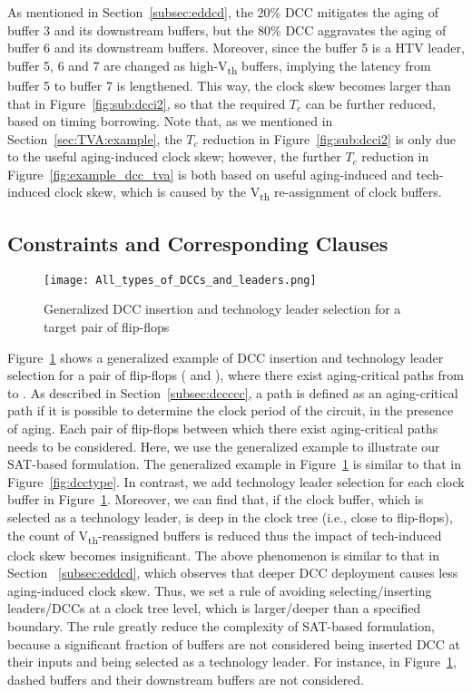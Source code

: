As mentioned in Section~\ref{subsec:eddcd}, the 20\% DCC mitigates the aging of buffer 3 and its downstream buffers, but the 80\% DCC aggravates the aging of buffer 6 and its downstream buffers. Moreover, since the buffer 5 is a HTV leader, buffer 5, 6 and 7 are changed as high-V\textsubscript{th} buffers, implying the latency from buffer 5 to buffer 7 is lengthened. This way, the clock skew becomes larger than that in Figure~\ref{fig:sub:dcci2}, so that the required $T_c$ can be further reduced, based on timing borrowing. Note that, as we mentioned in Section~\ref{sec:TVA:example}, the $T_c$ reduction in Figure~\ref{fig:sub:dcci2} is only due to the useful aging-induced clock skew; however, the  further $T_c$ reduction in Figure~\ref{fig:example_dcc_tva} is both based on useful aging-induced and tech-induced clock skew, which is caused by the V\textsubscript{th} re-assignment of clock buffers. 

\subsection{Constraints and Corresponding Clauses}
\label{sec:TVA:leaderconstraint}
\begin{figure}
    \centering
    \texttt{[image: All\_types\_of\_DCCs\_and\_leaders.png]}
    \caption{Generalized DCC insertion and technology leader selection for a target pair of flip-flops}
    \label{fig:g_dcc_leader}
\end{figure}

Figure~\ref{fig:g_dcc_leader} shows a generalized example of DCC insertion and technology leader selection for a pair of flip-flops ( and ), where there exist aging-critical paths from  to . As described in Section~\ref{subsec:dccccc}, a path is defined as an aging-critical path if it is possible to determine the clock period of the circuit, in the presence of aging. Each pair of flip-flops between which there exist aging-critical paths needs to be considered. Here, we use the generalized example to illustrate our SAT-based formulation. The generalized example in Figure~\ref{fig:g_dcc_leader} is similar to that in Figure~\ref{fig:dcctype}. In contrast, we add technology leader selection for each clock buffer in Figure~\ref{fig:g_dcc_leader}. Moreover, we can find that, if the clock buffer, which is selected as a technology leader, is deep in the clock tree (i.e., close to flip-flops), the count of V\textsubscript{th}-reassigned buffers is reduced thus the impact of tech-induced clock skew becomes insignificant. The above phenomenon is similar to that in Section ~\ref{subsec:eddcd}, which observes that deeper DCC deployment causes less aging-induced clock skew. Thus, we set a rule of avoiding selecting/inserting leaders/DCCs at a clock tree level, which is larger/deeper than a specified boundary.  The rule greatly reduce the complexity of SAT-based formulation, because a significant fraction of buffers are not considered being inserted DCC at their inputs and being selected as a technology leader. For instance, in Figure~\ref{fig:g_dcc_leader}, dashed buffers and their downstream buffers are not considered. 

